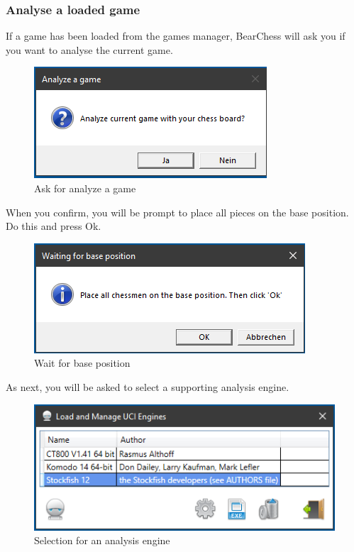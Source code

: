 \documentclass[11pt,a4paper]{article}
\begin{document}
\subsubsection{Analyse a loaded game} \label{AnalyzeMode21}
If a game has been loaded from the games manager, BearChess will ask you if you want to analyse the current game.\\
\begin{figure}[H]
	\centering
	\includegraphics[scale=1.0]{AnalyzeGame1.png}
	\caption{Ask for analyze a game}
	\label{fig:AnalyzeGame1}
\end{figure}

When you confirm, you will be prompt to place all pieces on the base position. Do this and press Ok.
\begin{figure}[H]
	\centering
	\includegraphics[scale=1.0]{AnalyzeGame2.png}
	\caption{Wait for base position}
	\label{fig:AnalyzeGame2}
\end{figure}
As next, you will be asked to select a supporting analysis engine.

\begin{figure}[H]
	\centering
	\includegraphics[scale=0.9]{AnalyzeMode2.png}
	\caption{Selection for an analysis engine}
	\label{fig:AnalyzeMode2_3}
\end{figure}
\end{document}
